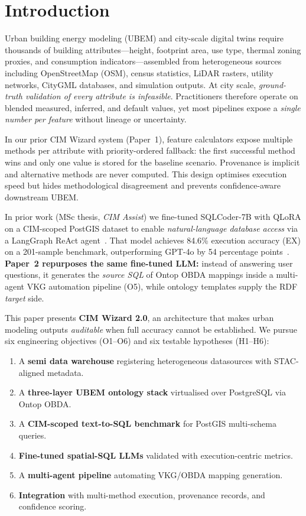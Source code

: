 \section{Introduction}
\label{sec:introduction}

Urban building energy modeling (UBEM) and city-scale digital twins require thousands of building attributes---height, footprint area, use type, thermal zoning proxies, and consumption indicators---assembled from heterogeneous sources including OpenStreetMap (OSM), census statistics, LiDAR rasters, utility networks, CityGML databases, and simulation outputs.
At city scale, \emph{ground-truth validation of every attribute is infeasible}.
Practitioners therefore operate on blended measured, inferred, and default values, yet most pipelines expose a \emph{single number per feature} without lineage or uncertainty.

In our prior CIM Wizard system (Paper~1), feature calculators expose multiple methods per attribute with priority-ordered fallback: the first successful method wins and only one value is stored for the baseline scenario.
Provenance is implicit and alternative methods are never computed.
This design optimises execution speed but hides methodological disagreement and prevents confidence-aware downstream UBEM.

In prior work (MSc thesis, \emph{CIM Assist}) we fine-tuned SQLCoder-7B with QLoRA on a CIM-scoped PostGIS dataset to enable \emph{natural-language database access} via a LangGraph ReAct agent~\cite{taherdoust2025cimassist}.
That model achieves 84.6\% execution accuracy (EX) on a 201-sample benchmark, outperforming GPT-4o by 54 percentage points~\cite{taherdoust2025cimassist}.
\textbf{Paper~2 repurposes the same fine-tuned LLM:} instead of answering user questions, it generates the \emph{source SQL} of Ontop OBDA mappings inside a multi-agent VKG automation pipeline (O5), while ontology templates supply the RDF \emph{target} side.

This paper presents \textbf{CIM Wizard 2.0}, an architecture that makes urban modeling outputs \emph{auditable} when full accuracy cannot be established.
We pursue six engineering objectives (O1--O6) and six testable hypotheses (H1--H6):
\begin{enumerate}[label=\textbf{O\arabic*:}, leftmargin=*]
  \item A \textbf{semi data warehouse} registering heterogeneous datasources with STAC-aligned metadata.
  \item A \textbf{three-layer UBEM ontology stack} virtualised over PostgreSQL via Ontop OBDA.
  \item A \textbf{CIM-scoped text-to-SQL benchmark} for PostGIS multi-schema queries.
  \item \textbf{Fine-tuned spatial-SQL LLMs} validated with execution-centric metrics.
  \item A \textbf{multi-agent pipeline} automating VKG/OBDA mapping generation.
  \item \textbf{Integration} with multi-method execution, provenance records, and confidence scoring.
\end{enumerate}

